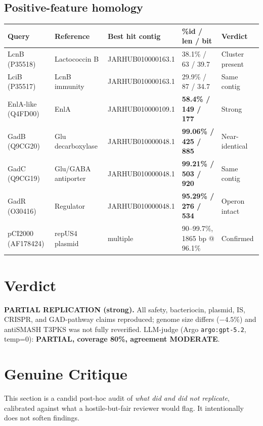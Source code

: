 \documentclass[11pt,a4paper]{article}
\begin{document}
\subsection{Positive-feature homology}
\begin{longtable}{@{}p{3cm}p{3.4cm}p{3.4cm}p{2.5cm}p{2cm}@{}}
\toprule
Query & Reference & Best hit contig & \%id / len / bit & Verdict \\
\midrule
LcnB (P35518) & Lactococcin B & JARHUB010000163.1 & 38.1\% / 63 / 39.7 & Cluster present \\
LciB (P35517) & LcnB immunity & JARHUB010000163.1 & 29.9\% / 87 / 34.7 & Same contig \\
EnlA-like (Q4FD00) & EnlA & JARHUB010000109.1 & \textbf{58.4\% / 149 / 177} & Strong \\
GadB (Q9CG20) & Glu decarboxylase & JARHUB010000048.1 & \textbf{99.06\% / 425 / 885} & Near-identical \\
GadC (Q9CG19) & Glu/GABA antiporter & JARHUB010000048.1 & \textbf{99.21\% / 503 / 920} & Same contig \\
GadR (O30416) & Regulator & JARHUB010000048.1 & \textbf{95.29\% / 276 / 534} & Operon intact \\
pCI2000 (AF178424) & repUS4 plasmid & multiple & 90--99.7\%, 1865 bp @ 96.1\% & Confirmed \\
\bottomrule
\end{longtable}

\section{Verdict}
\textbf{PARTIAL REPLICATION (strong).} All safety, bacteriocin, plasmid, IS, CRISPR, and GAD-pathway claims reproduced; genome size differs ($-4.5\%$) and antiSMASH T3PKS was not fully reverified. LLM-judge (Argo \texttt{argo:gpt-5.2}, temp=0): \textbf{PARTIAL, coverage 80\%, agreement MODERATE}.

\section{Genuine Critique}
This section is a candid post-hoc audit of \emph{what did and did not replicate}, calibrated against what a hostile-but-fair reviewer would flag. It intentionally does not soften findings.
\end{document}
